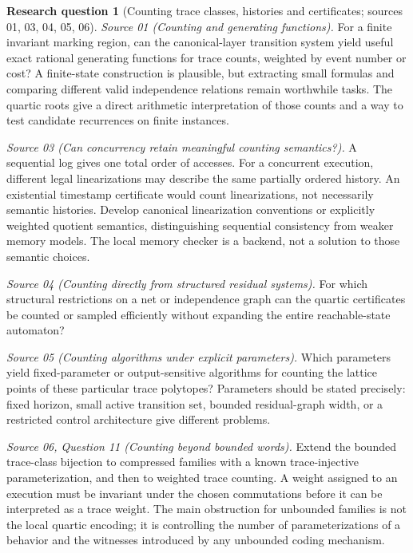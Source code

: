 \documentclass[11pt,a4paper]{article}
\theoremstyle{definition}
\newtheorem{question}[question]{Research question}
\theoremstyle{remark}
\begin{document}
\begin{question}[Counting trace classes, histories and certificates; sources 01, 03, 04, 05, 06]\label{cdc:q:counting}
\emph{Source 01 (Counting and generating functions).}
For a finite invariant marking region, can the canonical-layer transition system yield useful exact rational generating functions for trace counts, weighted by event number or cost? A finite-state construction is plausible, but extracting small formulas and comparing different valid independence relations remain worthwhile tasks. The quartic roots give a direct arithmetic interpretation of those counts and a way to test candidate recurrences on finite instances.

\emph{Source 03 (Can concurrency retain meaningful counting semantics?).}
A sequential log gives one total order of accesses. For a concurrent execution,
different legal linearizations may describe the same partially ordered history.
An existential timestamp certificate would count linearizations, not necessarily
semantic histories. Develop canonical linearization conventions or explicitly
weighted quotient semantics, distinguishing sequential consistency from weaker
memory models. The local memory checker is a backend, not a solution to those
semantic choices.

\emph{Source 04 (Counting directly from structured residual systems).}
For which structural restrictions on a net or independence graph can the quartic certificates be counted or sampled efficiently without expanding the entire reachable-state automaton?

\emph{Source 05 (Counting algorithms under explicit parameters).}
Which parameters yield fixed-parameter or output-sensitive algorithms for counting the lattice points of these particular trace polytopes? Parameters should be stated precisely: fixed horizon, small active transition set, bounded residual-graph width, or a restricted control architecture give different problems.

\emph{Source 06, Question 11 (Counting beyond bounded words).}
Extend the bounded trace-class bijection to compressed
families with a known trace-injective parameterization, and then to weighted
trace counting. A weight assigned to an execution must be invariant under
the chosen commutations before it can be interpreted as a trace weight.
The main obstruction for unbounded families is not the local quartic
encoding; it is controlling the number of parameterizations of a behavior
and the witnesses introduced by any unbounded coding mechanism.
\end{question}
\end{document}
